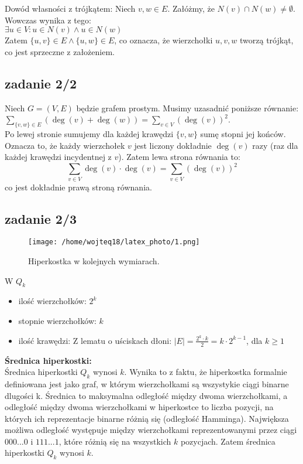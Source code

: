 \documentclass{article}
\begin{document}
Dowód własności z trójkątem:
Niech ${v, w} \in E$. Załóżmy, że $N(v) \cap N(w) \neq \emptyset$. Wowczas wynika z tego: \\
$\exists u \in V: u \in N(v) \land u \in N(w)$ \\
Zatem $\{u, v\} \in E \land \{u, w\} \in E$, co oznacza, że wierzchołki $u, v, w$ tworzą trójkąt, co jest sprzeczne z założeniem.

\subsection*{zadanie 2/2}
Niech $G = (V, E)$ będzie grafem prostym. Musimy uzasadnić poniższe równanie:
$\sum_{\{v, w\} \in E} (\deg(v) + \deg(w)) = \sum_{v \in V} (\deg(v))^2$. \\
Po lewej stronie sumujemy dla każdej krawędzi $\{v, w\}$ sumę stopni jej końców. Oznacza to, że każdy wierzchołek $v$ jest liczony dokładnie $\deg(v)$ razy (raz dla każdej krawędzi incydentnej z $v$). Zatem lewa strona równania to:
\[\sum_{v \in V} \deg(v) \cdot \deg(v) = \sum_{v \in V} (\deg(v))^2\]
co jest dokładnie prawą stroną równania.

\newpage

\subsection*{zadanie 2/3}
\begin{figure}[h!]
    \centering
    \texttt{[image: /home/wojteq18/latex\_photo/1.png]}
    \caption{Hiperkostka w kolejnych wymiarach.}
    \label{fig:obrazek1}
\end{figure}

W $Q_{k}$
\begin{itemize}
    \item ilość wierzchołków: $2^k$
    \item stopnie wierzchołków: $k$
    \item ilość krawędzi: Z lematu o uściskach dłoni: $|E| = \frac{2^k \cdot k}{2} = k \cdot 2^{k-1}$, dla $ k \geq 1$
\end{itemize}

\textbf{Średnica hiperkostki:} \\
Średnica hiperkostki $Q_k$ wynosi $k$. Wynika to z faktu, że hiperkostka formalnie definiowana jest jako graf, w którym wierzchołkami są wszystykie ciągi binarne dlugości k.
Średnica to maksymalna odległość między dwoma wierzchołkami, a odległość między dwoma wierzchołkami w hiperkostce to liczba pozycji, na których ich reprezentacje binarne różnią się (odległość Hamminga). 
Największa możliwa odległość występuje między wierzchołkami reprezentowanymi przez ciągi $000...0$ i $111...1$, które różnią się na wszystkich $k$ pozycjach. Zatem średnica hiperkostki $Q_k$ wynosi $k$. \\
\end{document}
